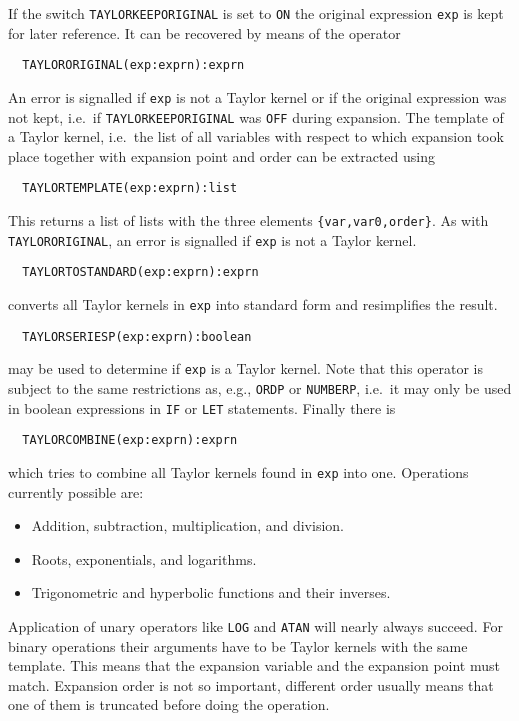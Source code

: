 If the switch \verb|TAYLORKEEPORIGINAL| is set to \verb|ON| the
original expression \verb|exp| is kept for later reference.
It can be recovered by means of the operator
\begin{verbatim}
  TAYLORORIGINAL(exp:exprn):exprn
\end{verbatim}
An error is signalled if \verb|exp| is not a Taylor kernel or
if the original expression was not kept, i.e.\ if 
\verb|TAYLORKEEPORIGINAL| was \verb|OFF| during expansion.
The template of a Taylor kernel, i.e.\ the list of all
variables with respect to which expansion took place together with
expansion point and order can be extracted using
\begin{verbatim}
  TAYLORTEMPLATE(exp:exprn):list
\end{verbatim}
This returns a list of lists with the three elements
\verb|{var,var0,order}|.
As with \verb|TAYLORORIGINAL|,
an error is signalled if \verb|exp| is not a Taylor kernel.
\begin{verbatim}
  TAYLORTOSTANDARD(exp:exprn):exprn
\end{verbatim}
converts all Taylor kernels in \verb|exp| into standard form and
resimplifies the result.
\begin{verbatim}
  TAYLORSERIESP(exp:exprn):boolean
\end{verbatim}
may be used to determine if \verb|exp| is a Taylor kernel.
Note that this operator is subject to the same restrictions as,
e.g., \verb|ORDP| or \verb|NUMBERP|, i.e.\ it may only be 
used in boolean expressions in \verb|IF| or \verb|LET| statements.
Finally there is
\begin{verbatim}
  TAYLORCOMBINE(exp:exprn):exprn
\end{verbatim}
which tries to combine all Taylor kernels found in \verb|exp| into one.
Operations currently possible are:
\begin{itemize}
  \item Addition, subtraction, multiplication, and division.
  \item Roots, exponentials, and logarithms.
  \item Trigonometric and hyperbolic functions and their inverses.
\end{itemize}
Application of unary operators like \verb|LOG| and \verb|ATAN| will
nearly always succeed. For binary operations their arguments have to be
Taylor kernels with the same template. This means that the expansion
variable and the expansion point must match. Expansion order is not so
important, different order usually means that one of them is truncated
before doing the operation.

